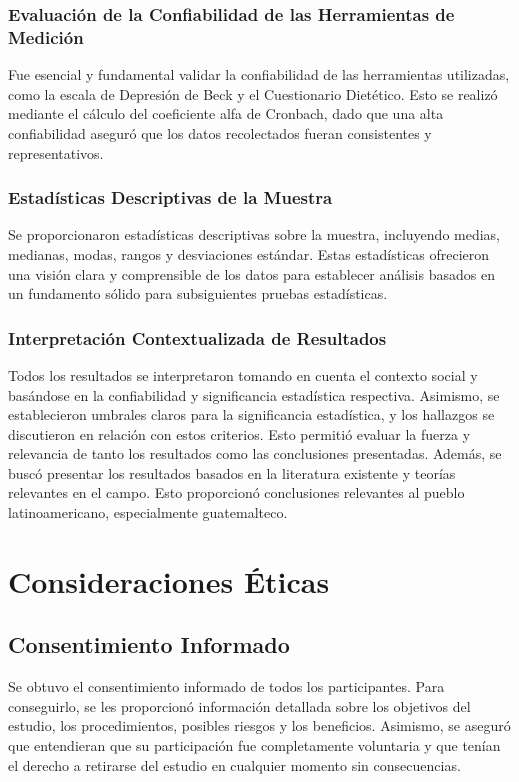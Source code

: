 \documentclass[stu, 12pt]{apa7}
\begin{document}
	\subsubsection{Evaluación de la Confiabilidad de las Herramientas de Medición}
	Fue esencial y fundamental validar la confiabilidad de las herramientas utilizadas, como la escala de Depresión de Beck y el Cuestionario Dietético. Esto se realizó mediante el cálculo del coeficiente alfa de Cronbach, dado que una alta confiabilidad aseguró que los datos recolectados fueran consistentes y representativos.

	\subsubsection{Estadísticas Descriptivas de la Muestra}
	Se proporcionaron estadísticas descriptivas sobre la muestra, incluyendo medias, medianas, modas, rangos y desviaciones estándar. Estas estadísticas ofrecieron una visión clara y comprensible de los datos para establecer análisis basados en un fundamento sólido para subsiguientes pruebas estadísticas.

	\subsubsection{Interpretación Contextualizada de Resultados} 
	Todos los resultados se interpretaron tomando en cuenta el contexto social y basándose en la confiabilidad y significancia estadística respectiva. Asimismo, se establecieron umbrales claros para la significancia estadística, y los hallazgos se discutieron en relación con estos criterios. Esto permitió evaluar la fuerza y relevancia de tanto los resultados como las conclusiones presentadas. Además, se buscó presentar los resultados basados en la literatura existente y teorías relevantes en el campo. Esto proporcionó conclusiones relevantes al pueblo latinoamericano, especialmente guatemalteco.

	\section{Consideraciones Éticas}\label{consideraciones-uxe9ticas}

	\subsection{Consentimiento Informado}\label{consentimiento-informado}

	Se obtuvo el consentimiento informado de todos los participantes. Para
	conseguirlo, se les proporcionó información detallada sobre los
	objetivos del estudio, los procedimientos, posibles riesgos y los
	beneficios. Asimismo, se aseguró que entendieran que su participación fue
	completamente voluntaria y que tenían el derecho a retirarse del estudio
	en cualquier momento sin consecuencias.
\end{document}
